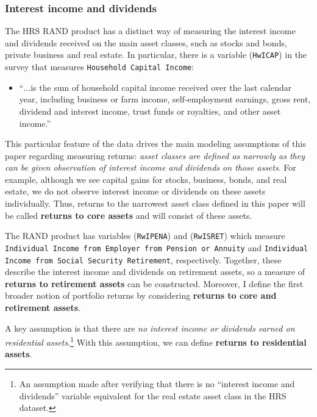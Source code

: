 \subsubsection{Interest income and dividends}
\label{sssec:interest_income_dividends}

\par The HRS RAND product has a distinct way of measuring the interest income and dividends received on the main asset classes, such as stocks and bonds, private business and real estate. In particular, there is a variable (\texttt{HwICAP}) in the survey that measures \texttt{Household Capital Income}:

\begin{itemize}
  \item ``$\ldots$is the sum of household capital income received over the last calendar year, including business or farm income, self-employment earnings, gross rent, dividend and interest income, trust funds or royalties, and other asset income.''
  \end{itemize}

  \par This particular feature of the data drives the main modeling assumptions of this paper regarding measuring returns: \textit{asset classes are defined as narrowly as they can be given observation of interest income and dividends on those assets}. For example, although we see capital gains for stocks, business, bonds, and real estate, we do not observe interest income or dividends on these assets individually. Thus, returns to the narrowest asset class defined in this paper will be called \textbf{returns to core assets} and will consist of these assets.

  \par The RAND product has variables (\texttt{RwIPENA}) and (\texttt{RwISRET}) which measure \texttt{Individual Income from Employer from Pension or Annuity} and \texttt{Individual Income from Social Security Retirement}, respectively. Together, these describe the interest income and dividends on retirement assets, so a measure of \textbf{returns to retirement assets} can be constructed. Moreover, I define the first broader notion of portfolio returns by considering \textbf{returns to core and retirement assets}.

  \par A key assumption is that there are \textit{no interest income or dividends earned on residential assets}.\footnote{An assumption made after verifying that there is no ``interest income and dividends'' variable equivalent for the real estate asset class in the HRS dataset. } With this assumption, we can define \textbf{returns to residential assets}. 
  

